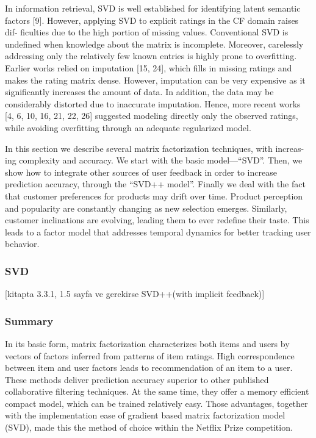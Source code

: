In information retrieval, SVD is well established for identifying latent semantic factors [9]. However, applying SVD to explicit ratings in the CF domain raises dif- ficulties due to the high portion of missing values. Conventional SVD is undefined when knowledge about the matrix is incomplete. Moreover, carelessly addressing only the relatively few known entries is highly prone to overfitting. Earlier works relied on imputation [15, 24], which fills in missing ratings and makes the rating matrix dense. However, imputation can be very expensive as it significantly increases the amount of data. In addition, the data may be considerably distorted due to inaccurate imputation. Hence, more recent works [4, 6, 10, 16, 21, 22, 26] suggested modeling directly only the observed ratings, while avoiding overfitting through an adequate regularized model.

In this section we describe several matrix factorization techniques, with increas- ing complexity and accuracy. We start with the basic model—“SVD”. Then, we show how to integrate other sources of user feedback in order to increase prediction accuracy, through the “SVD++ model”. Finally we deal with the fact that customer preferences for products may drift over time. Product perception and popularity are constantly changing as new selection emerges. Similarly, customer inclinations are evolving, leading them to ever redefine their taste. This leads to a factor model that addresses temporal dynamics for better tracking user behavior.

\subsubsection{SVD}
[kitapta 3.3.1, 1.5 sayfa ve gerekirse SVD++(with implicit feedback)]

\subsubsection{Summary}

In its basic form, matrix factorization characterizes both items and users by vectors of factors inferred from patterns of item ratings. High correspondence between item and user factors leads to recommendation of an item to a user. These methods deliver prediction accuracy superior to other published collaborative filtering techniques. At the same time, they offer a memory efficient compact model, which can be trained relatively easy. Those advantages, together with the implementation ease of gradient based matrix factorization model (SVD), made this the method of choice within the Netflix Prize competition.

